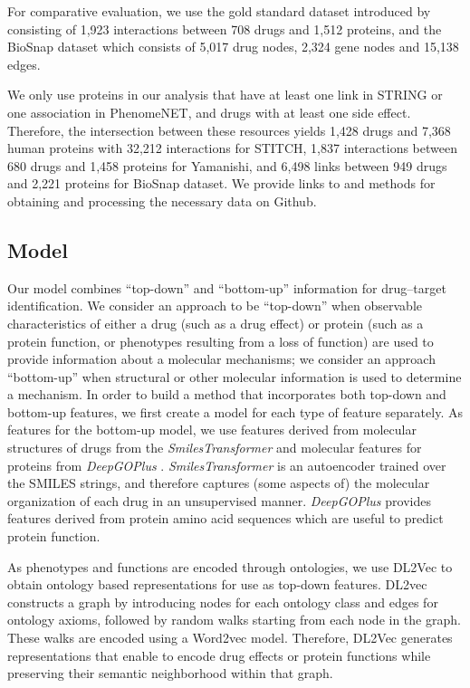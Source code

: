 \documentclass{bioinfo}
\renewcommand{\cite}{\citep}
\begin{document}
For comparative evaluation, we use the gold standard dataset
introduced by \citet{Yamanishi2008} consisting of 1,923 interactions
between 708 drugs and 1,512 proteins, and the BioSnap dataset
\cite{BioSnap2018} which consists of 5,017 drug nodes, 2,324 gene
nodes and 15,138 edges.

We only use proteins in our analysis that have at least one link in STRING or one association in PhenomeNET, and drugs with at least one side effect. Therefore, the intersection between these
resources yields 1,428 drugs and 7,368 human proteins with 32,212
interactions for STITCH, 1,837 interactions between 680 drugs and 1,458 proteins for Yamanishi, and 6,498 links between 949 drugs and 2,221 proteins for BioSnap dataset. We provide links to and methods
for obtaining and processing the necessary data on Github.

 
\subsection{Model}

Our model combines ``top-down'' and ``bottom-up'' information for
drug--target identification. We consider an approach to be
``top-down'' when observable characteristics of either a drug (such as
a drug effect) or protein (such as a protein function, or phenotypes
resulting from a loss of function) are used to provide information
about a molecular mechanisms; we consider an approach ``bottom-up''
when structural or other molecular information is used to determine a
mechanism.  In order to build a method that incorporates both top-down
and bottom-up features, we first create a model for each type of
feature separately.  As features for the bottom-up model, we use
features derived from molecular structures of drugs from the
\textit{SmilesTransformer} \citep{SmilesTransformer} and molecular
features for proteins from \textit{DeepGOPlus}
\citep{DeepGoPlus}. \textit{SmilesTransformer} is an autoencoder
trained over the SMILES strings, and therefore captures (some aspects
of) the molecular organization of each drug in an unsupervised manner.
\textit{DeepGOPlus} provides features derived from protein amino acid
sequences which are useful to predict protein function.

As phenotypes and functions are encoded through ontologies, we use
DL2Vec \citep{DL2vec2020} to obtain ontology based representations for
use as top-down features. DL2vec constructs a graph by introducing
nodes for each ontology class and edges for ontology axioms, followed
by random walks starting from each node in the graph. These walks are
encoded using a Word2vec \citep{Word2vec2013} model. Therefore, DL2Vec
generates representations that enable to encode drug effects or protein
functions while preserving their semantic neighborhood within that
graph.
\end{document}
